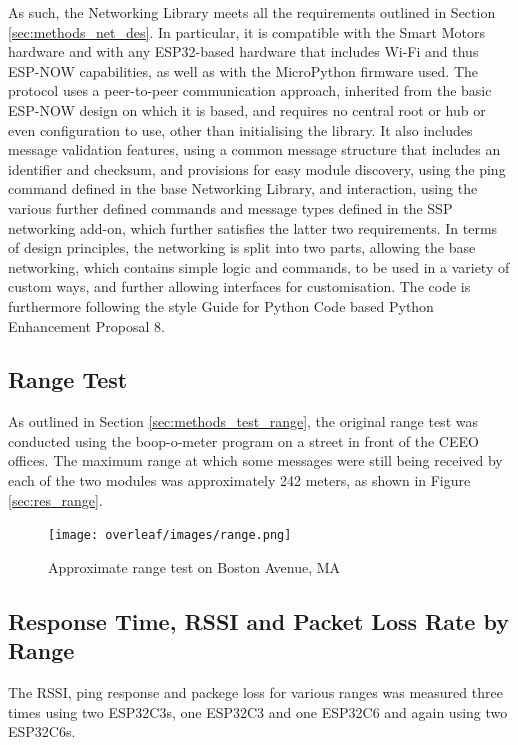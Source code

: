 As such, the Networking Library meets all the requirements outlined in Section \ref{sec:methods_net_des}. In particular, it is compatible with the Smart Motors hardware and with any ESP32-based hardware that includes Wi-Fi and thus ESP-NOW capabilities, as well as with the MicroPython firmware used. The protocol uses a peer-to-peer communication approach, inherited from the basic ESP-NOW design on which it is based, and requires no central root or hub or even configuration to use, other than initialising the library. It also includes message validation features, using a common message structure that includes an identifier and checksum, and provisions for easy module discovery, using the ping command defined in the base Networking Library, and interaction, using the various further defined commands and message types defined in the SSP networking add-on, which further satisfies the latter two requirements. In terms of design principles, the networking is split into two parts, allowing the base networking, which contains simple logic and commands, to be used in a variety of custom ways, and further allowing interfaces for customisation. The code is furthermore following the style Guide for Python Code based Python Enhancement Proposal 8. \citep{rossum_python_2001}

\subsection{\label{sec:res_range}Range Test}

As outlined in Section \ref{sec:methods_test_range}, the original range test was conducted using the boop-o-meter program on a street in front of the CEEO offices. The maximum range at which some messages were still being received by each of the two modules was approximately 242 meters, as shown in Figure \ref{sec:res_range}.

\begin{figure}[H]
    \centering
    \texttt{[image: overleaf/images/range.png]}
    \vspace{\ftspace}
    \caption{Approximate range test on Boston Avenue, MA}
    \label{fig:range}
\end{figure}


\subsection{\label{sec:res_rssi}Response Time, RSSI and Packet Loss Rate by Range}

The RSSI, ping response and packege loss for various ranges was measured three times using two ESP32C3s, one ESP32C3 and one ESP32C6 and again using two ESP32C6s.


